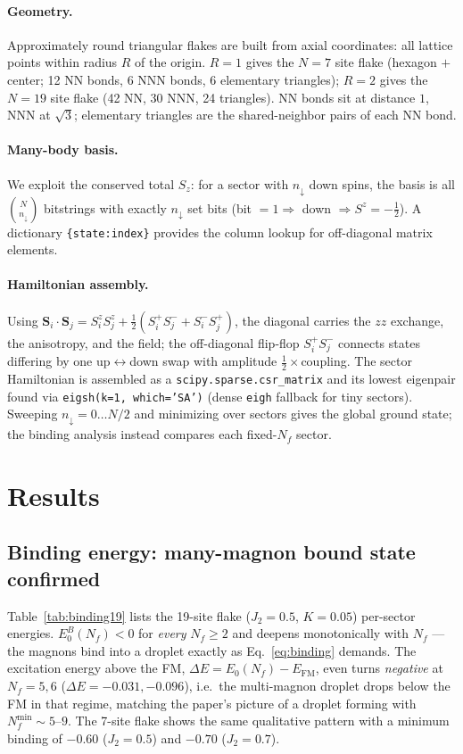\documentclass[11pt]{article}
\newcommand{\Svec}{\mathbf{S}}
\begin{document}
\paragraph{Geometry.} Approximately round triangular flakes are built from axial coordinates: all
lattice points within radius $R$ of the origin. $R=1$ gives the $N=7$ site flake (hexagon $+$
center; 12 NN bonds, 6 NNN bonds, 6 elementary triangles); $R=2$ gives the $N=19$ site flake (42 NN,
30 NNN, 24 triangles). NN bonds sit at distance $1$, NNN at $\sqrt{3}$; elementary triangles are the
shared-neighbor pairs of each NN bond.

\paragraph{Many-body basis.} We exploit the conserved total $S_z$: for a sector with $n_\downarrow$
down spins, the basis is all $\binom{N}{n_\downarrow}$ bitstrings with exactly $n_\downarrow$ set
bits (bit $=1 \Rightarrow$ down $\Rightarrow S^z=-\tfrac12$). A dictionary \texttt{\{state:index\}}
provides the column lookup for off-diagonal matrix elements.

\paragraph{Hamiltonian assembly.} Using
$\Svec_i\cdot\Svec_j = S_i^z S_j^z + \tfrac12(S_i^+S_j^- + S_i^-S_j^+)$, the diagonal carries the
$zz$ exchange, the anisotropy, and the field; the off-diagonal flip-flop $S_i^+S_j^-$ connects
states differing by one up$\leftrightarrow$down swap with amplitude $\tfrac12\times$coupling. The
sector Hamiltonian is assembled as a \texttt{scipy.sparse.csr\_matrix} and its lowest eigenpair
found via \texttt{eigsh(k=1, which='SA')} (dense \texttt{eigh} fallback for tiny sectors). Sweeping
$n_\downarrow = 0\ldots N/2$ and minimizing over sectors gives the global ground state; the binding
analysis instead compares each fixed-$N_f$ sector.

\section{Results}

\subsection{Binding energy: many-magnon bound state confirmed}
Table~\ref{tab:binding19} lists the 19-site flake ($J_2=0.5$, $K=0.05$) per-sector energies.
$E_0^B(N_f)<0$ for \emph{every} $N_f\ge2$ and deepens monotonically with $N_f$ --- the magnons bind
into a droplet exactly as Eq.~\eqref{eq:binding} demands. The excitation energy above the FM,
$\Delta E = E_0(N_f)-E_{\mathrm{FM}}$, even turns \emph{negative} at $N_f=5,6$
($\Delta E=-0.031,-0.096$), i.e.\ the multi-magnon droplet drops below the FM in that regime,
matching the paper's picture of a droplet forming with $N_f^{\min}\sim5$--$9$. The 7-site flake
shows the same qualitative pattern with a minimum binding of $-0.60$ ($J_2=0.5$) and $-0.70$
($J_2=0.7$).
\end{document}
